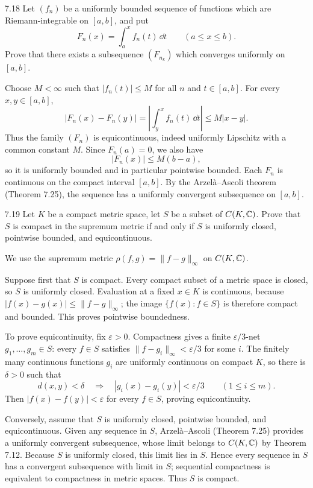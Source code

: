\documentclass[11pt, oneside]{article}
\begin{document}
\begin{exercise}{7.18}
Let $(f_n)$ be a uniformly bounded sequence of functions which are Riemann-integrable on $[a, b]$, and put
\[
 F_n(x)=\int_a^x f_n(t)\,\dd t\qquad(a\le x\le b).
\]
Prove that there exists a subsequence $(F_{n_k})$ which converges uniformly on $[a, b]$.
\end{exercise}
\begin{solution}
Choose $M<\infty$ such that $|f_n(t)|\le M$ for all $n$ and $t\in[a, b]$. For every $x, y\in[a, b]$,
\[
 |F_n(x)-F_n(y)|=\left|\int_y^x f_n(t)\,\dd t\right|
 \le M|x-y|.
\]
Thus the family $(F_n)$ is equicontinuous, indeed uniformly Lipschitz with a common constant $M$. Since $F_n(a)=0$, we also have
\[
 |F_n(x)|\le M(b-a),
\]
so it is uniformly bounded and in particular pointwise bounded. Each $F_n$ is continuous on the compact interval $[a, b]$. By the Arzelà--Ascoli theorem (Theorem 7.25), the sequence has a uniformly convergent subsequence on $[a, b]$.
\end{solution}

\begin{exercise}{7.19}
Let $K$ be a compact metric space, let $S$ be a subset of $C(K, \mathbb{C})$. Prove that $S$ is compact in the supremum metric if and only if $S$ is uniformly closed, pointwise bounded, and equicontinuous.
\end{exercise}
\begin{solution}
We use the supremum metric $\rho(f, g)=\|f-g\|_\infty$ on $C(K, \mathbb{C})$.

Suppose first that $S$ is compact. Every compact subset of a metric space is closed, so $S$ is uniformly closed. Evaluation at a fixed $x\in K$ is continuous, because $|f(x)-g(x)|\le\|f-g\|_\infty$; the image $\{f(x):f\in S\}$ is therefore compact and bounded. This proves pointwise boundedness.

To prove equicontinuity, fix $\varepsilon>0$. Compactness gives a finite $\varepsilon/3$-net $g_1, \ldots, g_m\in S$: every $f\in S$ satisfies $\|f-g_i\|_\infty<\varepsilon/3$ for some $i$. The finitely many continuous functions $g_i$ are uniformly continuous on compact $K$, so there is $\delta>0$ such that
\[
 d(x, y)<\delta\quad\Longrightarrow\quad
 |g_i(x)-g_i(y)|<\varepsilon/3\qquad(1\le i\le m).
\]
Then $|f(x)-f(y)|<\varepsilon$ for every $f\in S$, proving equicontinuity.

Conversely, assume that $S$ is uniformly closed, pointwise bounded, and equicontinuous. Given any sequence in $S$, Arzelà--Ascoli (Theorem 7.25) provides a uniformly convergent subsequence, whose limit belongs to $C(K, \mathbb{C})$ by Theorem 7.12. Because $S$ is uniformly closed, this limit lies in $S$. Hence every sequence in $S$ has a convergent subsequence with limit in $S$; sequential compactness is equivalent to compactness in metric spaces. Thus $S$ is compact.
\end{solution}
\end{document}
